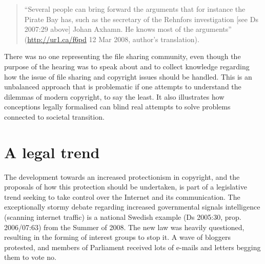 \begin{quote}
``Several people can bring forward the arguments that for instance the Pirate
Bay has, such as the secretary of the Rehnfors investigation [see Ds 2007:29
above] Johan Axhamn. He knows most of the arguments''
(\url{http://ur1.ca/f6pd} 12 Mar 2008, author's translation).
\end{quote}

There was no one representing the f\hbox{}ile sharing community, even though the
purpose of the hearing was to speak about and to collect knowledge regarding how
the issue of f\hbox{}ile sharing and copyright issues should be handled. This is an
unbalanced approach that is problematic if one attempts to understand the
dilemmas of modern copyright, to say the least. It also illustrates how
conceptions legally formalised can blind real attempts to solve problems
connected to societal transition.


\section{A legal trend}
\label{s:darling_conceptions:legal_trend}

The development towards an increased protectionism in copyright, and the
proposals of how this protection should be undertaken, is part of a legislative
trend seeking to take control over the Internet and its communication. The
exceptionally stormy debate regarding increased governmental signals
intelligence (scanning internet traf\hbox{}f\hbox{}ic) is a national Swedish example (Ds
2005:30, prop. 2006/07:63) from the Summer of 2008. The new law was heavily
questioned, resulting in the forming of interest groups to stop it. A wave of
bloggers protested, and members of Parliament received lots of e-mails and
letters begging them to vote no. 

